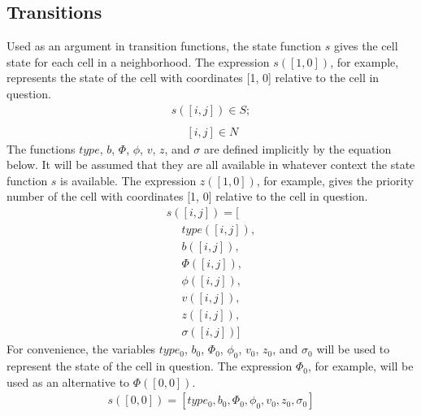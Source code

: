 \documentclass{acm_proc_article-sp}
\begin{document}
\subsection{Transitions} \label{Transitions}
Used as an argument in transition functions, the state function $s$ 
gives the cell state for each cell in a neighborhood.  The expression
$s([1, 0])$, for example, represents the state of the cell with 
coordinates [1, 0] relative to the cell in question.
\begin{displaymath} \begin{array}{l}
s([i, j]) \in S; \\
\\
\hspace{16pt} [i, j] \in N
\end{array} \end{displaymath}
The functions $type$, $b$, $\Phi$, $\phi$, $v$, $z$, and $\sigma$ are
defined implicitly by the equation below.  It will be assumed that they 
are all available in whatever context the state function $s$ is 
available.  The expression $z([1, 0])$, for example, gives the priority
number of the cell with coordinates [1, 0] relative to the cell in 
question.
\begin{displaymath} \begin{array}{l}
s([i, j]) = [\\
\hspace{16pt} type([i, j]), \\
\hspace{16pt} b([i, j]), \\
\hspace{16pt} \Phi([i, j]), \\
\hspace{16pt} \phi([i, j]), \\
\hspace{16pt} v([i, j]), \\
\hspace{16pt} z([i, j]), \\
\hspace{16pt} \sigma([i, j])]
\end{array} \end{displaymath}
For convenience, the variables $type_0$, $b_0$, $\Phi_0$, $\phi_0$, 
$v_0$, $z_0$, and $\sigma_0$ will be used to represent the state of
the cell in question.  The expression $\Phi_0$, for example, will be 
used as an alternative to $\Phi([0, 0])$.
\begin{displaymath} \begin{array}{l}
s([0, 0]) = [type_0, b_0, \Phi_0, \phi_0, v_0, z_0, \sigma_0]
\end{array} \end{displaymath}
\end{document}
